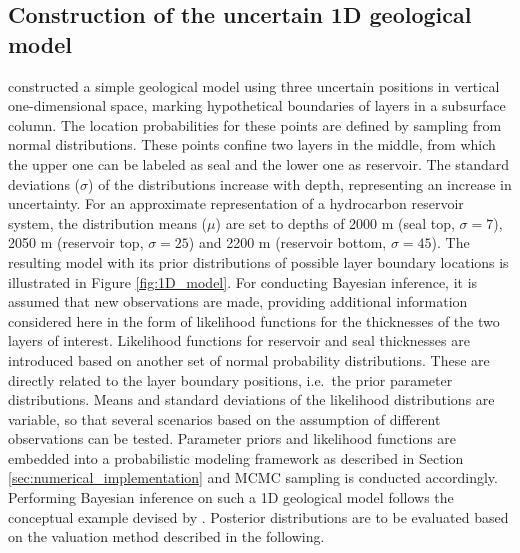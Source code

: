 			\subsection{Construction of the uncertain 1D geological model}\label{sec:1D_construction}	
			\citet{delaVarga2016} constructed a simple geological model using three uncertain positions in vertical one-dimensional space, marking hypothetical boundaries of layers in a subsurface column. The location probabilities for these points are defined by sampling from normal distributions. These points confine two layers in the middle, from which the upper one can be labeled as seal and the lower one as reservoir. The standard deviations ($\sigma$) of the distributions increase with depth, representing an increase in uncertainty. For an approximate representation of a hydrocarbon reservoir system, the distribution means ($\mu$) are set to depths of 2000 m (seal top, $\sigma=7$), 2050 m (reservoir top, $\sigma=25$) and 2200 m (reservoir bottom, $\sigma=45$). The resulting model with its prior distributions of possible layer boundary locations is illustrated in Figure \ref{fig:1D_model}.
			For conducting Bayesian inference, it is assumed that new observations are made, providing additional information considered here in the form of likelihood functions for the thicknesses of the two layers of interest. Likelihood functions for reservoir and seal thicknesses are introduced based on another set of normal probability distributions. These are directly related to the layer boundary positions, i.e.\ the prior parameter distributions. Means and standard deviations of the likelihood distributions are variable, so that several scenarios based on the assumption of different observations can be tested. Parameter priors and likelihood functions are embedded into a probabilistic modeling framework as described in Section \ref{sec:numerical_implementation} and MCMC sampling is conducted accordingly. Performing Bayesian inference on such a 1D geological model follows the conceptual example devised by \citet{delaVarga2016}. Posterior distributions are to be evaluated based on the valuation method described in the following.
			
